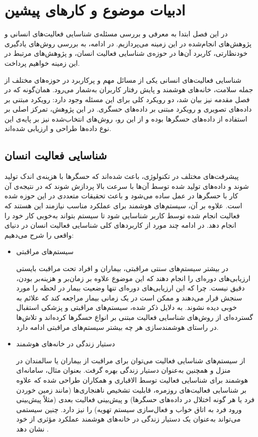 \chapter{ادبیات موضوع و کارهای پیشین}
\clearpage

در این فصل ابتدا به معرفی و بررسی مسئله‌ی شناسایی فعالیت‌های انسانی و پژوهش‌های انجام‌شده در این زمینه می‌پردازیم. در ادامه، به بررسی روش‌های یادگیری خودنظارتی، کاربرد آن‌ها در حوزه‌ی شناسایی فعالیت انسان، و پژوهش‌های مرتبط در این زمینه خواهیم پرداخت.

شناسایی فعالیت‌های انسانی یکی از مسائل مهم و پرکاربرد در حوزه‌های مختلف از جمله سلامت، خانه‌های هوشمند و پایش رفتار کاربران به‌شمار می‌رود. همان‌گونه که در فصل مقدمه نیز بیان شد، دو رویکرد کلی برای این مسئله وجود دارد: رویکرد مبتنی بر داده‌های تصویری و رویکرد مبتنی بر داده‌های حسگری. در این پژوهش، تمرکز اصلی بر استفاده از داده‌های حسگرها بوده و از این رو، روش‌های انتخاب‌شده نیز بر پایه‌ی این نوع داده‌ها طراحی و ارزیابی شده‌اند.

\section{شناسایی فعالیت انسان}

پیشرفت‌های مختلف در تکنولوژی، باعث شده‌اند که حسگرها با هزینه‌ی اندک تولید شوند و داده‌های تولید شده توسط آن‌ها با سرعت بالا پردازش شوند که در نتیجه‌ی آن کار با حسگرها در عمل ساده می‌شود و باعث تحقیقات متعددی در این حوزه شده است. علاوه بر آن، سیستم‌های هوشمند برای عملکرد مناسب نیازمند این هستند که فعالیت انجام شده توسط کاربر شناسایی شود تا سیستم بتواند به‌خوبی کار خود را انجام دهد. در ادامه چند مورد از کاربردهای کلی شناسایی فعالیت انسان در دنیای واقعی را شرح می‌دهیم:

\begin{itemize}
\item{سیستم‌های مراقبتی}

در بیشتر سیستم‌های سنتی مراقبتی، بیماران و افراد تحت مراقبت بایستی ارزیابی‌های دوره‌ای را انجام دهند که این موضوع علاوه بر زمان‌بر و هزینه‌بر بودن، دقیق نیست. چرا که این ارزیابی‌های دوره‌ای تنها وضعیت بیمار در لحظه را مورد سنجش قرار می‌دهند و ممکن است در یک زمانی بیمار مراجعه کند که علائم به خوبی دیده نشوند. به دلایل ذکر شده، سیستم‌های مراقبتی و پزشکی استقبال گسترده‌ای از روش‌های شناسایی فعالیت مبتنی بر انواع حسگرها کرده‌اند و تلاش‌ها در راستای هوشمندسازی هر چه بیشتر سیستم‌های مراقبتی ادامه دارد.

\item{دستیار زندگی در خانه‌های هوشمند}

از سیستم‌های شناسایی فعالیت می‌توان برای مراقبت از بیماران یا سالمندان در منزل و همچنین به‌عنوان دستیار زندگی بهره گرفت. بعنوان مثال، سامانه‌ای هوشمند برای شناسایی فعالیت توسط الاقباری و همکاران طراحی شده که علاوه بر شناسایی فعالیت‌های روزمره، قابلیت تشخیص ناهنجاری‌ها (مانند زمین خوردن فرد یا هر گونه اختلال در داده‌های حسگرها) و پیش‌بینی فعالیت بعدی (مثلاً پیش‌بینی ورود فرد به اتاق خواب و فعال‌سازی سیستم تهویه) را نیز دارد. چنین سیستمی می‌تواند به‌عنوان یک دستیار زندگی در خانه‌های هوشمند عملکرد مؤثری از خود نشان دهد \cite{alaghbari2022activities}.
‪
\end{itemize}

